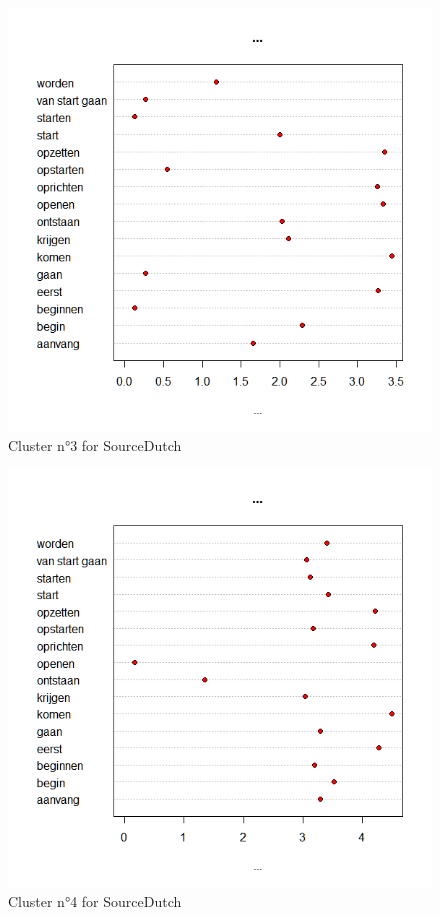 \begin{figure}
\includegraphics[height=.4\textheight]{figures/Vandevoorde2-img58.png}
\caption{\label{fig:4:58}  Cluster n°3 for SourceDutch}
\end{figure}

\begin{figure}
\includegraphics[height=.4\textheight]{figures/Vandevoorde2-img59.png}
\caption{\label{fig:4:59}  Cluster n°4 for SourceDutch}
\end{figure}

